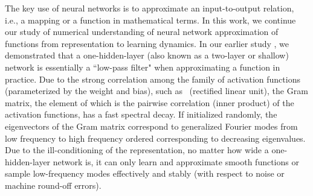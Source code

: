 \documentclass[review,hidelinks,onefignum,onetabnum]{siamart250211}
\begin{document}
The key use of neural networks is to approximate an input-to-output relation, i.e., a mapping or a function in mathematical terms. In this work, we continue our study of numerical understanding of neural network approximation of functions from representation to learning dynamics. In our earlier study \cite{ZZZZ-23}, we demonstrated that a one-hidden-layer (also known as a two-layer or shallow) network is essentially a ``low-pass filter" when approximating a function in practice. Due to the strong correlation among the family of activation functions (parameterized by the weight and bias), such as \ReLU\  (rectified linear unit), the Gram matrix, the element of which is the pairwise correlation (inner product) of the activation functions, has a fast spectral decay. If initialized randomly, the eigenvectors of the Gram matrix correspond to generalized Fourier modes from low frequency to high frequency ordered corresponding to decreasing eigenvalues. Due to the ill-conditioning of the representation, no matter how wide a one-hidden-layer network is, it can only learn and approximate smooth functions or sample low-frequency modes effectively and stably (with respect to noise or machine round-off errors). 
\end{document}
